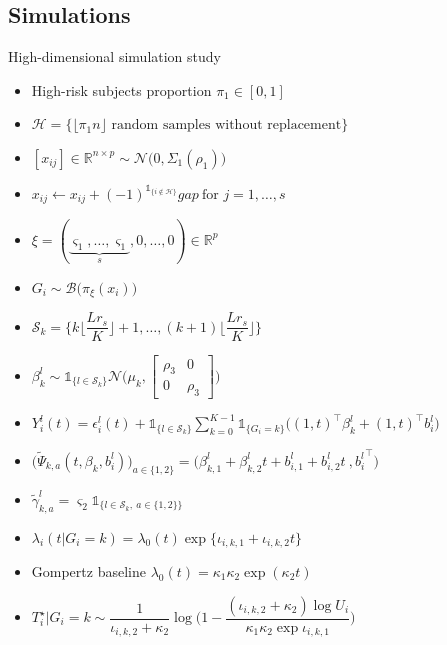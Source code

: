 \documentclass{beamer}
\newcommand{\R}{\mathbb R}
\newcommand{\cB}{\mathcal B}
\newcommand{\cH}{\mathcal H}
\newcommand{\cS}{\mathcal S}
\newcommand{\cN}{\mathcal N}
\newcommand{\bSigma}{\textbf{$\Sigma$}}
\newcommand{\ind}[1]{\mathds{1}_{#1}}
\begin{document}
\subsection{Simulations}

\begin{frame}{High-dimensional simulation study}

\begin{itemize}
 \small
 \item<1-> High-risk subjects proportion $\pi_1 \in [0,1]$
 \item<2-> $\cH = \big\{\lfloor \pi_1 n \rfloor \text{ random samples without replacement} \big\}$
 \item<3-> $[x_{ij}] \in \R^{n \times p} \sim \cN \big(0, \bSigma_1(\rho_1)\big)$
 \item<4-> $x_{ij} \leftarrow x_{ij} + (-1)^{\ind{\{i \notin \cH\}}} gap\ \text{for } j = 1, \dots, s$
 \item<5-> $\xi = (\underbrace{\varsigma_1,\ldots,\varsigma_1}_s,0,\ldots,0) \in \R^p$
 \item<6-> $G_i \sim \cB\big(\pi_\xi(x_i)\big)$
 \item<7-> $\cS_k=\Big\{ k \big\lfloor \dfrac{L r_s}{K} \big\rfloor + 1, \ldots,  (k + 1) \big\lfloor \dfrac{L r_s}{K} \big\rfloor \Big\}$
 \item<8-> $\beta_k^l \sim \ind{\{l \in \cS_k \}} \cN\Big( 
\mu_k, 
\begin{bmatrix}
  \rho_3 & 0\\
  0 & \rho_3
\end{bmatrix} 
\Big)$
 \item<9-> $Y_i^l(t) = \epsilon_i^l(t) + \ind{\{l \in \cS_k \}}\sum_{k=0}^{K-1} \ind{\{G_i=k\}} \big( (1, t)^\top \beta_k^l + (1, t)^\top b_i^l \big)$
 \item<10-> $\big(\tilde \Psi_{k,a}(t, \beta_k, b_i^l)\big)_{a \in \{1,2\}} = \big(\beta_{k,1}^l + \beta_{k,2}^l t + b_{i,1}^l + b_{i,2}^l t\ , {b_i^l}^\top \big)$
 \item<11-> $\tilde \gamma_{k,a}^l = \varsigma_2 \ind{\{l \in \cS_k,\ a\in \{1, 2\} \}}$
 \item<12-> $\lambda_i(t|G_i = k) = \lambda_0(t) \exp \big\{ \iota_{i,k,1} + \iota_{i,k,2} t \big\}$
 \item<13-> Gompertz baseline $\lambda_0(t) = \kappa_1 \kappa_2 \exp(\kappa_2t)$
 \item<14-> $T_i^\star | G_i=k \sim \dfrac{1}{\iota_{i,k,2} + \kappa_2} \log \Big(1 - \dfrac{(\iota_{i,k,2} + \kappa_2) \log U_i}{\kappa_1 \kappa_2 \exp\iota_{i,k,1}} \Big)$
\end{itemize}

\end{frame}
\end{document}
